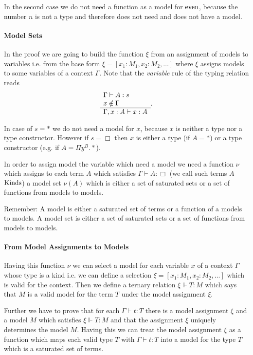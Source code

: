 In the second case we do not need a function as a model for $\text{even}$, because
the number $n$ is not a type and therefore does not need and does not have a
model.


\paragraph{Model Sets}
In the proof we are going to build the function $\xi$ from an assignment of
models to variables i.e. from the base form $\xi = [x_1:M_1, x_2:M_2,\ldots]$
where $\xi$ assigns models to some variables of a context $\Gamma$. Note that
the \emph{variable} rule of the typing relation reads
$$
\begin{array}{l} \Gamma \vdash A:s
\\ x \notin \Gamma \\ \hline \Gamma,x:A \vdash x :A\end{array}.
$$

In case of $s = *$ we do not need a model for $x$, because $x$ is neither a
type nor a type constructor. However if $s = \Box$ then $x$ is either a type
(if $A = *$) or a type constructor (e.g. if $A = \Pi y^B.*$).

In order to assign model the variable which need a model we need a function
$\nu$ which assigns to each term $A$ which satisfies $\Gamma \vdash A:\Box$
(we call such terms $A$ $\text{Kinds}$) a model set $\nu(A)$ which is either a set
of saturated sets or a set of functions from models to models.

Remember: A model is either a saturated set of terms or a function of a models
to models. A model set is either a set of saturated sets or a set of functions
from models to models.

\paragraph{From Model Assignments to Models}
Having this function $\nu$ we can select a model for each variable $x$ of a
context $\Gamma$ whose type is a kind i.e. we can define a selection
$\xi = [x_1:M_1, x_2:M_2,\ldots]$ which is valid for the context. Then we
define a ternary relation $\xi \Vdash T : M$ which says that $M$ is a valid
model for the term $T$ under the model assignment $\xi$.

Further we have to prove that for each $\Gamma \vdash t:T$ there is a model
assignment $\xi$ and a model $M$ which satisfies $\xi \Vdash T:M$ and that the
assignment $\xi$ uniquely determines the model $M$. Having this we can treat
the model assignment $\xi$ as a function which maps each valid type $T$ with
$\Gamma \vdash t:T$ into a model for the type $T$ which is a saturated set of
terms.




